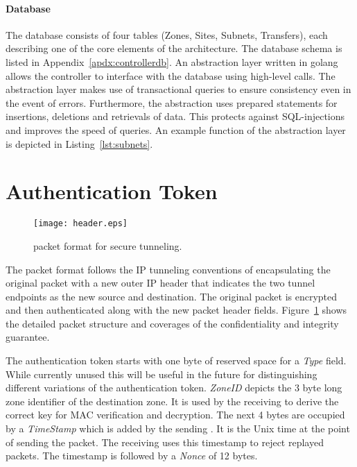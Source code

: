 \paragraph{Database}
The database consists of four tables (Zones, Sites, Subnets, Transfers), each describing one of
the core elements of the architecture.
The database schema is listed in Appendix~\ref{apdx:controllerdb}. An abstraction layer
written in golang allows the controller to interface with the database using high-level calls.
The abstraction layer makes use of transactional queries to ensure consistency even in the event
of errors. Furthermore, the abstraction uses prepared statements for insertions, deletions and
retrievals of data. This protects against SQL-injections and improves the speed of queries.
An example function of the abstraction layer is depicted in Listing~\ref{lst:subnets}.

\section{Authentication Token}
\label{sec:token}

\begin{figure}[htb]
	\begin{center}
		\texttt{[image: header.eps]}
	\end{center}
	\caption{\name packet format for secure tunneling.}
	\label{fig:header}
\end{figure}

The \name packet format follows the IP tunneling conventions of encapsulating the original
packet with a new outer IP header that indicates the two tunnel endpoints as the new source
and destination. The original packet is encrypted and then authenticated along with the new
packet header fields. Figure~\ref{fig:header} shows the detailed packet structure and coverages
of the confidentiality and integrity guarantee.

The authentication token starts with one byte of reserved space for a \textit{Type} field. While
currently unused this will be useful in the future for distinguishing different variations of
the authentication token. \textit{ZoneID} depicts the 3 byte long zone identifier of the
destination zone. It is used by the receiving \tp to derive the correct key for MAC verification
and decryption. The next 4 bytes are occupied by a \textit{TimeStamp} which is added by the
sending \tp. It is the Unix time at the point of sending the packet. The receiving \tp uses this
timestamp to reject replayed packets. The timestamp is followed by a \textit{Nonce} of 12 bytes.

